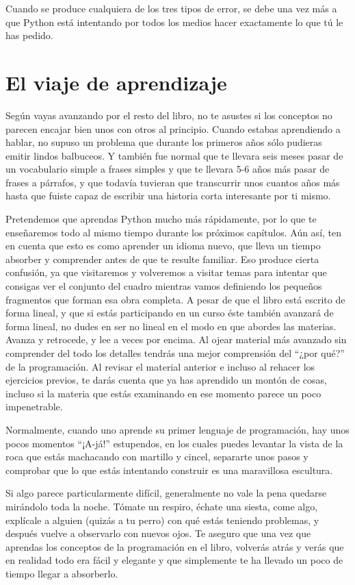 Cuando se produce cualquiera de los tres tipos de error, se debe una vez más a que Python está
intentando por todos los medios hacer exactamente lo que tú le has pedido.

\section{El viaje de aprendizaje}

Según vayas avanzando por el resto del libro, no te asustes si los conceptos
no parecen encajar bien unos con otros al principio. Cuando estabas aprendiendo a hablar,
no supuso un problema que durante los primeros años sólo pudieras emitir lindos
balbuceos. Y también fue normal que te llevara seis meses pasar de un vocabulario simple
a frases simples y que te llevara 5-6 años más pasar de frases a párrafos, y que todavía tuvieran que transcurrir
unos cuantos años más hasta que fuiste capaz de escribir una historia corta interesante por ti mismo.

Pretendemos que aprendas Python mucho más rápidamente, por lo que te enseñaremos
todo al mismo tiempo durante los próximos capítulos.
Aún así, ten en cuenta que esto es como aprender un idioma nuevo, que lleva un tiempo
absorber y comprender antes de que te resulte familiar.
Eso produce cierta confusión, ya que visitaremos y volveremos a visitar
temas para intentar que consigas ver el conjunto del cuadro mientras vamos definiendo
los pequeños fragmentos que forman esa obra completa. A pesar de que el libro está
escrito de forma lineal, y que si estás participando en un curso éste también avanzará
de forma lineal, no dudes en ser no lineal en el modo en que abordes las materias.
Avanza y retrocede, y lee a veces por encima. Al ojear material más avanzado sin comprender del
todo los detalles tendrás una mejor comprensión del ``¿por qué?'' de la programación.
Al revisar el material anterior e incluso al rehacer los ejercicios previos,
te darás cuenta que ya has aprendido un montón de cosas, incluso si la materia
que estás examinando en ese momento parece un poco impenetrable.

Normalmente, cuando uno aprende su primer lenguaje de programación, hay unos pocos
momentos ``¡A-já!'' estupendos, en los cuales puedes levantar la vista de la roca que
estás machacando con martillo y cincel, separarte unos pasos y comprobar
que lo que estás intentando construir es una maravillosa escultura.

Si algo parece particularmente difícil, generalmente no vale la pena quedarse mirándolo
toda la noche. Tómate un respiro, échate una siesta, come algo, explícale a alguien
(quizás a tu perro) con qué estás teniendo problemas, y después vuelve a observarlo con nuevos
ojos. Te aseguro que una vez que aprendas los conceptos de la programación en
el libro, volverás atrás y verás que en realidad todo era fácil y elegante y que
simplemente te ha llevado un poco de tiempo llegar a absorberlo.

